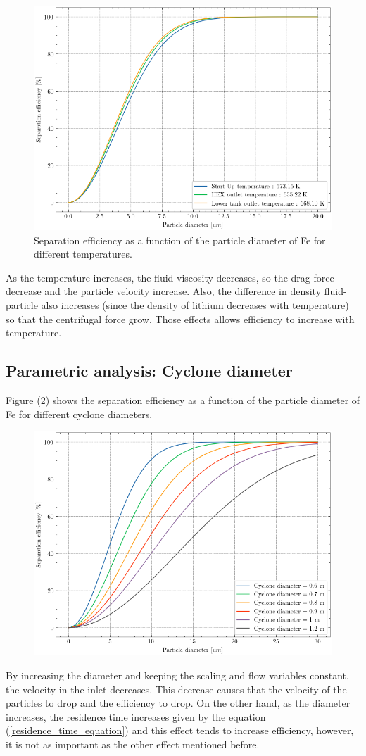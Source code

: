 \begin{figure}[H]
	\centering
	\includegraphics[width=0.5\linewidth]{images/efficiency_vs_Temperature.png}
	\captionsetup{font=bf, size=small}
	\caption{Separation efficiency as a function of the particle diameter of Fe for different temperatures.}
	\label{temperature_cyclone}
\end{figure}
As the temperature increases, the fluid viscosity decreases, so the drag force  decrease and the particle velocity increase. Also, the difference in density fluid-particle also increases (since the density of lithium decreases with temperature) so that the centrifugal force grow. Those effects allows efficiency to increase with temperature.
\subsection{Parametric analysis: Cyclone diameter}
Figure (\ref{cyclone_diameter})  shows the separation efficiency as a function of the particle diameter of Fe for different cyclone diameters.

\begin{figure}[H]
	\centering
	\includegraphics[width=0.5\linewidth]{images/efficiency_vs_cyclone_diameter.png}
	\captionsetup{font=bf, size=small}
	\caption{}
	\label{cyclone_diameter}
\end{figure}
By increasing the diameter and keeping the scaling and flow variables constant, the velocity in the inlet decreases. This decrease causes that the velocity of the particles to drop and the efficiency to drop. On the other hand, as the diameter increases, the residence time increases given by the equation (\ref{residence_time_equation}) and this effect tends to increase efficiency, however, it is not as important as the other effect mentioned before.

